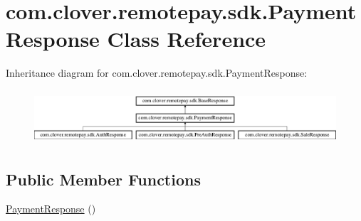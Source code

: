 \hypertarget{classcom_1_1clover_1_1remotepay_1_1sdk_1_1_payment_response}{}\section{com.\+clover.\+remotepay.\+sdk.\+Payment\+Response Class Reference}
\label{classcom_1_1clover_1_1remotepay_1_1sdk_1_1_payment_response}
Inheritance diagram for com.\+clover.\+remotepay.\+sdk.\+Payment\+Response\+:\begin{figure}[H]
\begin{center}
\leavevmode
\includegraphics[height=2.028986cm]{classcom_1_1clover_1_1remotepay_1_1sdk_1_1_payment_response}
\end{center}
\end{figure}
\subsection*{Public Member Functions}
\begin{DoxyCompactItemize}
\item 
\hyperlink{classcom_1_1clover_1_1remotepay_1_1sdk_1_1_payment_response_a78b60aba6e82269bc92535d36bbb0c8c}{Payment\+Response} ()
\end{DoxyCompactItemize}
